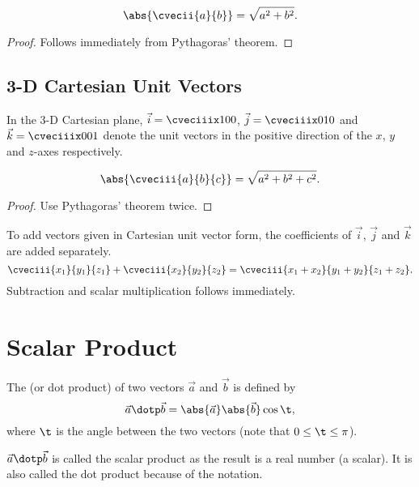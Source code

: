 \begin{proposition}[Magnitude in 2-D]
    \[\abs{\cvecii{a}{b}} = \sqrt{a^2 + b^2}.\]
\end{proposition}
\begin{proof}
    Follows immediately from Pythagoras' theorem.
\end{proof}

\subsection{3-D Cartesian Unit Vectors}

\begin{definition}
    In the 3-D Cartesian plane, $\vec i = \cveciiix100$, $\vec j = \cveciiix010$ and $\vec k = \cveciiix001$ denote the unit vectors in the positive direction of the $x$, $y$ and $z$-axes respectively.
\end{definition}

\begin{proposition}[Magnitude in 3-D]
    \[\abs{\cveciii{a}{b}{c}} = \sqrt{a^2 + b^2 + c^2}.\]
\end{proposition}
\begin{proof}
    Use Pythagoras' theorem twice.
\end{proof}

\begin{fact}
    To add vectors given in Cartesian unit vector form, the coefficients of $\vec i$, $\vec j$ and $\vec k$ are added separately. \[\cveciii{x_1}{y_1}{z_1} + \cveciii{x_2}{y_2}{z_2} = \cveciii{x_1+x_2}{y_1+y_2}{z_1+z_2}.\] Subtraction and scalar multiplication follows immediately.
\end{fact}

\section{Scalar Product}

\begin{definition}
    The  (or dot product) of two vectors $\vec a$ and $\vec b$ is defined by \[\vec a \dotp \vec b = \abs{\vec a} \abs{\vec b} \cos \t,\] where $\t$ is the angle between the two vectors (note that $0 \leq \t \leq \pi$).
\end{definition}
\begin{remark}
    $\vec a \dotp \vec b$ is called the scalar product as the result is a real number (a scalar). It is also called the dot product because of the notation.
\end{remark}

